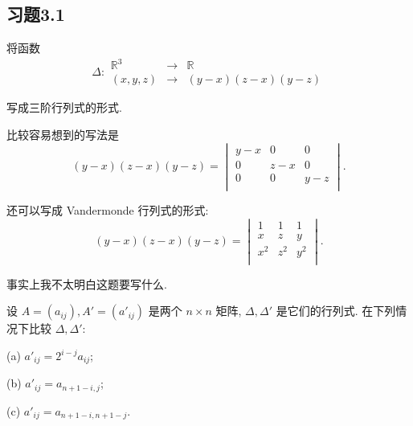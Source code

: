\documentclass[color=black,device=normal,lang=cn,mode=geye]{elegantnote}
\begin{document}
\subsection{习题3.1}
\begin{exercise}%
    将函数
    \[\Delta:\begin{array}{rcl}
        \mathbb{R}^3 & \to & \mathbb{R} \\
        (x,y,z) & \to & (y-x)(z-x)(y-z)
    \end{array}\]

    写成三阶行列式的形式.
\end{exercise}
\begin{solution}
    比较容易想到的写法是
    \[(y-x)(z-x)(y-z)=\begin{vmatrix}
        y-x & 0 & 0 \\
        0 & z-x & 0 \\
        0 & 0 & y-z \\
    \end{vmatrix}.\]

    还可以写成 Vandermonde 行列式的形式:
    \[(y-x)(z-x)(y-z)=\begin{vmatrix}
        1 & 1 & 1 \\
        x & z & y \\
        x^2 & z^2 & y^2 \\
    \end{vmatrix}.\]
\end{solution}
\begin{note}
    事实上我不太明白这题要写什么.
\end{note}
\begin{exercise}%
    设 $A=(a_{ij}),A'=(a'_{ij})$ 是两个 $n\times n$ 矩阵, $\Delta,\Delta'$ 是它们的行列式. 在下列情况下比较 $\Delta,\Delta'$:

    (a) $a'_{ij}=2^{i-j}a_{ij}$;

    (b) $a'_{ij}=a_{n+1-i,j}$;

    (c) $a'_{ij}=a_{n+1-i,n+1-j}$.
\end{exercise}
\end{document}
